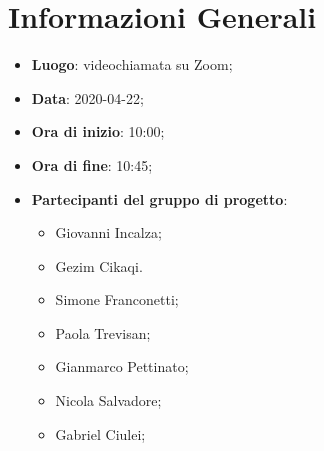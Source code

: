\section{Informazioni Generali}
	\begin{itemize}
		\item \textbf {Luogo}: videochiamata su Zoom;
		\item \textbf {Data}: 2020-04-22;
		\item \textbf {Ora di inizio}: 10:00;
		\item \textbf {Ora di fine}: 10:45;
		\item \textbf {Partecipanti del gruppo di progetto}:
			\begin{itemize}
				\item Giovanni Incalza;
				\item Gezim Cikaqi.
				\item Simone Franconetti;
				\item Paola Trevisan;
				\item Gianmarco Pettinato;
				\item Nicola Salvadore;
				\item Gabriel Ciulei;
			\end{itemize}
	\end{itemize}